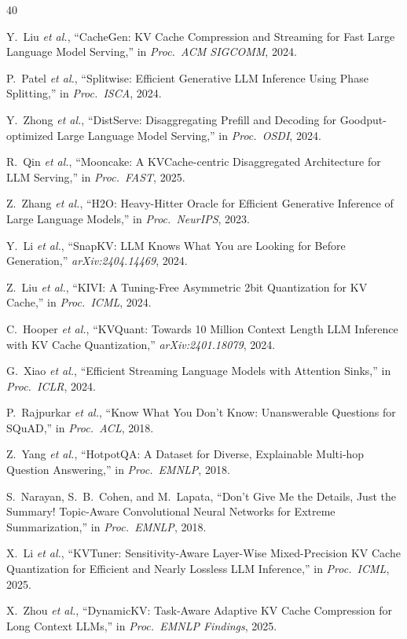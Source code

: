 \documentclass[journal]{IEEEtran}
\newcommand{\etal}{\textit{et al.}\xspace}
\begin{document}
\begin{thebibliography}{40}

Y.~Liu \etal, ``CacheGen: KV Cache Compression and Streaming for Fast Large Language Model Serving,'' in \emph{Proc.\ ACM SIGCOMM}, 2024.

P.~Patel \etal, ``Splitwise: Efficient Generative LLM Inference Using Phase Splitting,'' in \emph{Proc.\ ISCA}, 2024.

Y.~Zhong \etal, ``DistServe: Disaggregating Prefill and Decoding for Goodput-optimized Large Language Model Serving,'' in \emph{Proc.\ OSDI}, 2024.

R.~Qin \etal, ``Mooncake: A KVCache-centric Disaggregated Architecture for LLM Serving,'' in \emph{Proc.\ FAST}, 2025.

Z.~Zhang \etal, ``H2O: Heavy-Hitter Oracle for Efficient Generative Inference of Large Language Models,'' in \emph{Proc.\ NeurIPS}, 2023.

Y.~Li \etal, ``SnapKV: LLM Knows What You are Looking for Before Generation,'' \emph{arXiv:2404.14469}, 2024.

Z.~Liu \etal, ``KIVI: A Tuning-Free Asymmetric 2bit Quantization for KV Cache,'' in \emph{Proc.\ ICML}, 2024.

C.~Hooper \etal, ``KVQuant: Towards 10 Million Context Length LLM Inference with KV Cache Quantization,'' \emph{arXiv:2401.18079}, 2024.

G.~Xiao \etal, ``Efficient Streaming Language Models with Attention Sinks,'' in \emph{Proc.\ ICLR}, 2024.

P.~Rajpurkar \etal, ``Know What You Don't Know: Unanswerable Questions for SQuAD,'' in \emph{Proc.\ ACL}, 2018.

Z.~Yang \etal, ``HotpotQA: A Dataset for Diverse, Explainable Multi-hop Question Answering,'' in \emph{Proc.\ EMNLP}, 2018.

S.~Narayan, S.~B.~Cohen, and M.~Lapata, ``Don't Give Me the Details, Just the Summary! Topic-Aware Convolutional Neural Networks for Extreme Summarization,'' in \emph{Proc.\ EMNLP}, 2018.

X.~Li \etal, ``KVTuner: Sensitivity-Aware Layer-Wise Mixed-Precision KV Cache Quantization for Efficient and Nearly Lossless LLM Inference,'' in \emph{Proc.\ ICML}, 2025.

X.~Zhou \etal, ``DynamicKV: Task-Aware Adaptive KV Cache Compression for Long Context LLMs,'' in \emph{Proc.\ EMNLP Findings}, 2025.


\end{thebibliography}
\end{document}
